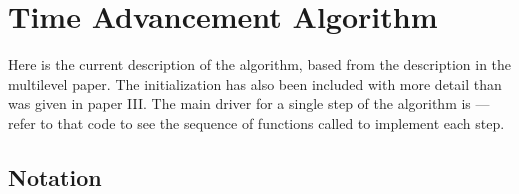 


\section{Time Advancement Algorithm}\label{Sec:Time Advancement Algorithm}
Here is the current description of the algorithm, based from the
description in the multilevel paper.  The initialization has also been
included with more detail than was given in paper III.  The main
driver for a single step of the algorithm is ---refer
to that code to see the sequence of functions called to implement each
step.


\subsection{Notation}

